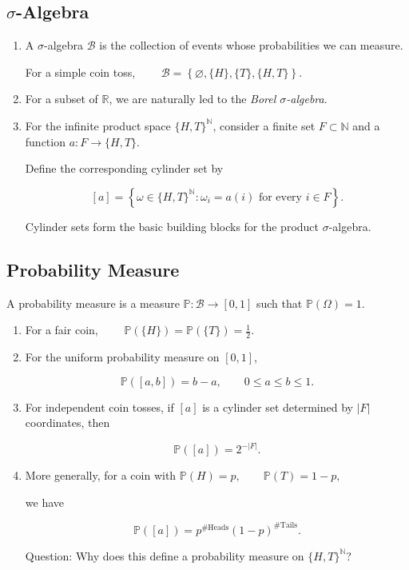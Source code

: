 \subsection{\texorpdfstring{$\sigma$-Algebra}{sigma-Algebra}}
\begin{enumerate}
    \item A $\sigma$-algebra $\mathcal{B}$ is the collection of events
whose probabilities we can measure.

For a simple coin toss,
\(\qquad
\mathcal{B}
=
\left\{
\varnothing,
\{H\},
\{T\},
\{H,T\}
\right\}.
\)

\item For a subset of $\mathbb{R}$, we are naturally led to the
\emph{Borel $\sigma$-algebra}.

\item For the infinite product space
\(\{H,T\}^{\mathbb{N}}\), consider a finite set
\(
F\subset\mathbb{N}
\)
and a function
\(
a:F\longrightarrow\{H,T\}.
\)

Define the corresponding cylinder set by

\[
[a]
=
\left\{
\omega\in\{H,T\}^{\mathbb{N}}
:
\omega_i=a(i)
\text{ for every }i\in F
\right\}.
\]

Cylinder sets form the basic building blocks for the product
$\sigma$-algebra.

    
\end{enumerate}
\subsection{Probability Measure}

A probability measure is a measure
\(
\mathbb{P}:\mathcal{B}\longrightarrow[0,1]
\)
such that
\(
\mathbb{P}(\Omega)=1.
\)
\begin{enumerate}
    \item For a fair coin,
\( \qquad
\mathbb{P}(\{H\})
=
\mathbb{P}(\{T\})
=
\frac12.
\)

\item For the uniform probability measure on $[0,1]$,

\[
\mathbb{P}([a,b])=b-a,
\qquad
0\leq a\leq b\leq1.
\]

\item For independent coin tosses, if $[a]$ is a cylinder set determined
by $|F|$ coordinates, then

\[
\mathbb{P}([a])
=
2^{-|F|}.
\]

\item More generally, for a coin with
\(
\mathbb{P}(H)=p,
\qquad
\mathbb{P}(T)=1-p,
\)

we have

\[
\mathbb{P}([a])
=
p^{\#\text{Heads}}
(1-p)^{\#\text{Tails}}.
\]


Question: Why does this define a probability measure on
\(\{H,T\}^{\mathbb{N}}\)?
    
\end{enumerate}
